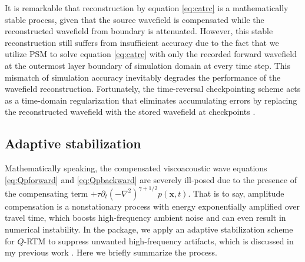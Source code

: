 It is remarkable that reconstruction by equation \ref{eq:catrc} is a mathematically stable process, given that the source wavefield is compensated while the reconstructed wavefield from boundary is attenuated. However, this stable reconstruction still suffers from insufficient accuracy due to the fact that we utilize PSM to solve equation \ref{eq:catrc} with only the recorded forward wavefield at the outermost layer boundary of simulation domain at every time step. This mismatch of simulation accuracy inevitably degrades the performance of the wavefield reconstruction. Fortunately, the time-reversal checkpointing scheme acts as a time-domain regularization that eliminates accumulating errors by replacing the reconstructed wavefield with the stored wavefield at checkpoints \citep{wang2017wavefield}.

\subsection{Adaptive stabilization}

Mathematically speaking, the compensated viscoacoustic wave equations \ref{eq:Qpforward} and \ref{eq:Qpbackward} are severely ill-posed due to the presence of the compensating term $+\tau \partial_t (-\nabla^2)^{\gamma+1/2} p(\mathbf{x},t)$. That is to say, amplitude compensation is a nonstationary process with energy exponentially amplified over travel time, which boosts high-frequency ambient noise and can even result in numerical instability. In the package, we apply an adaptive stabilization scheme for $Q$-RTM to suppress unwanted high-frequency artifacts, which is discussed in my previous work \citep{wang2018adaptive}. Here we briefly summarize the process.

